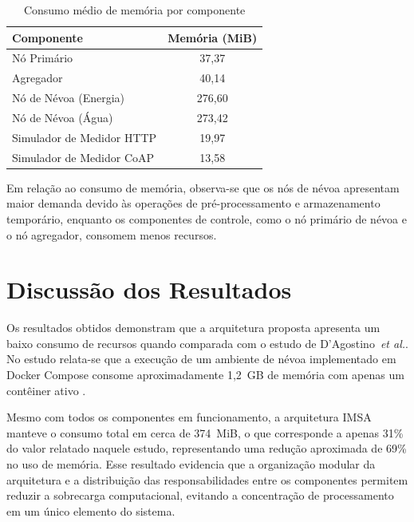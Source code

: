 \begin{table}[htb]
    \caption{\label{tab:memoria}Consumo médio de memória por componente}
    \centering
    \begin{tabular}{|l|c|}
        \hline
            \textbf{Componente} & \textbf{Memória (MiB)} \\ \hline
            Nó Primário & 37,37 \\ \hline
            Agregador & 40,14 \\ \hline
            Nó de Névoa (Energia) & 276,60 \\ \hline
            Nó de Névoa (Água) & 273,42 \\ \hline
            Simulador de Medidor HTTP & 19,97 \\ \hline
            Simulador de Medidor CoAP & 13,58 \\ \hline
    \end{tabular}
\end{table}

Em relação ao consumo de memória, observa-se que os nós de névoa apresentam maior demanda devido às operações de pré-processamento e armazenamento temporário, enquanto os componentes de controle, como o nó primário de névoa e o nó agregador, consomem menos recursos.

\section{Discussão dos Resultados}

Os resultados obtidos demonstram que a arquitetura proposta apresenta um baixo consumo de recursos quando comparada com o estudo de D’Agostino~\textit{et al.}. No estudo relata-se que a execução de um ambiente de névoa implementado em Docker Compose consome aproximadamente 1,2~GB de memória com apenas um contêiner ativo \cite{dagostino2025}. 

Mesmo com todos os componentes em funcionamento, a arquitetura \gls{IMSA} manteve o consumo total em cerca de 374~MiB, o que corresponde a apenas 31\% do valor relatado naquele estudo, representando uma redução aproximada de 69\% no uso de memória. Esse resultado evidencia que a organização modular da arquitetura e a distribuição das responsabilidades entre os componentes permitem reduzir a sobrecarga computacional, evitando a concentração de processamento em um único elemento do sistema.

